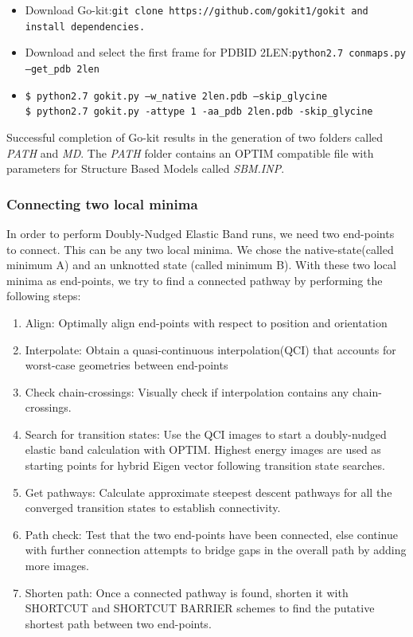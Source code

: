 \documentclass[journal=jacsat]{achemso}
\begin{document}
\begin{itemize}
\small
    \item {Download Go-kit\cite{Neelamraju19a}:\tt {git clone https://github.com/gokit1/gokit} and install dependencies.}
    \item{ Download and select the first frame for PDBID 2LEN:\tt{python2.7 conmaps.py --get\_pdb 2len}}
    \item{ \tt{\$ python2.7 gokit.py --w\_native 2len.pdb --skip\_glycine \\ \$ python2.7 gokit.py -attype 1 -aa\_pdb 2len.pdb -skip\_glycine}}
\end{itemize}

Successful completion of Go-kit results in the generation of two folders called \emph{PATH} and \emph{MD}. The \emph{PATH} folder contains an OPTIM compatible file with parameters for Structure Based Models called \emph{SBM.INP}. 

\subsubsection{Connecting two local minima}

In order to perform Doubly-Nudged Elastic Band \cite{DNEB1,DNEB2} runs, we need two end-points to connect. This can be any two local minima. We chose the native-state(called minimum A) and an unknotted state (called minimum B). With these two local minima as end-points, we try to find a connected pathway by performing the following steps:


\begin{enumerate}
    \item { Align: Optimally align end-points with respect to position and orientation}
    \item {Interpolate: Obtain a quasi-continuous interpolation\cite{QCI1,QCI2}(QCI) that accounts for worst-case geometries between end-points}
    \item{Check chain-crossings: Visually check if interpolation contains any chain-crossings.}
    \item{Search for transition states: Use the QCI images to start a doubly-nudged elastic band calculation with OPTIM\cite{OPTIM}. Highest energy images are used as starting points for hybrid Eigen vector following\cite{HEVF1,HEVF2} transition state searches.}
    \item{Get pathways: Calculate approximate steepest descent pathways for all the converged transition states to establish connectivity.}
    \item{Path check: Test that the two end-points have been connected, else continue with further connection attempts to bridge gaps in the overall path by adding more images.}
    \item{Shorten path: Once a connected pathway is found, shorten it with SHORTCUT\cite{Carr05a} and SHORTCUT BARRIER \cite{Strodel07a} schemes to find the putative shortest path between two end-points.}
\end{enumerate}
\end{document}
